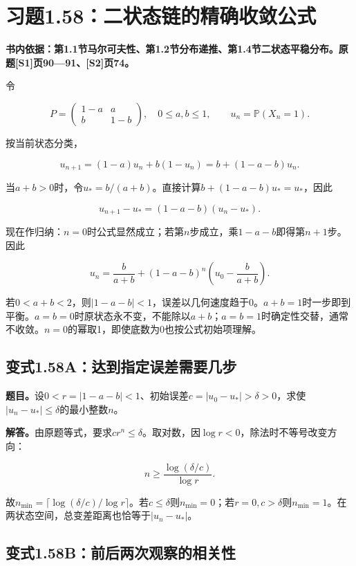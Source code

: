 \documentclass[
  11pt,a4paper,UTF8,fontset=fandol]{ctexart}
\begin{document}
\section{习题1.58：二状态链的精确收敛公式}\label{ux4e60ux98981.58ux4e8cux72b6ux6001ux94feux7684ux7cbeux786eux6536ux655bux516cux5f0f}

\textbf{书内依据：第1.1节马尔可夫性、第1.2节分布递推、第1.4节二状态平稳分布。原题{[}S1{]}页90---91、{[}S2{]}页74。}

令

\[
P=\begin{pmatrix}1-a&a\\b&1-b\end{pmatrix},\quad 0\le a,b\le1,
\qquad u_n=\mathbb P(X_n=1).
\]

按当前状态分类，

\[
u_{n+1}=(1-a)u_n+b(1-u_n)=b+(1-a-b)u_n.
\]

当\(a+b>0\)时，令\(u_*=b/(a+b)\)。直接计算\(b+(1-a-b)u_*=u_*\)，因此

\[
\boxed{u_{n+1}-u_*=(1-a-b)(u_n-u_*).}
\]

现在作归纳：\(n=0\)时公式显然成立；若第\(n\)步成立，乘\(1-a-b\)即得第\(n+1\)步。因此

\[
\boxed{u_n=\frac b{a+b}+(1-a-b)^n\left(u_0-\frac b{a+b}\right).}
\]

若\(0<a+b<2\)，则\(|1-a-b|<1\)，误差以几何速度趋于0。\(a+b=1\)时一步即到平衡。\(a=b=0\)时原状态永不变，不能除以\(a+b\)；\(a=b=1\)时确定性交替，通常不收敛。\(n=0\)的幂取1，即使底数为0也按公式初始项理解。

\subsection{变式1.58A：达到指定误差需要几步}\label{ux53d8ux5f0f1.58aux8fbeux5230ux6307ux5b9aux8befux5deeux9700ux8981ux51e0ux6b65}

\textbf{题目。}设\(0<r=|1-a-b|<1\)、初始误差\(c=|u_0-u_*|>\delta>0\)，求使\(|u_n-u_*|\le\delta\)的最小整数\(n\)。

\textbf{解答。}由原题等式，要求\(cr^n\le\delta\)。取对数，因\(\log r<0\)，除法时不等号改变方向：

\[
n\ge\frac{\log(\delta/c)}{\log r}.
\]

故\(\boxed{n_{\min}=\lceil\log(\delta/c)/\log r\rceil}\)。若\(c\le\delta\)则\(n_{\min}=0\)；若\(r=0,c>\delta\)则\(n_{\min}=1\)。在两状态空间，总变差距离也恰等于\(|u_n-u_*|\)。

\subsection{变式1.58B：前后两次观察的相关性}\label{ux53d8ux5f0f1.58bux524dux540eux4e24ux6b21ux89c2ux5bdfux7684ux76f8ux5173ux6027}
\end{document}
